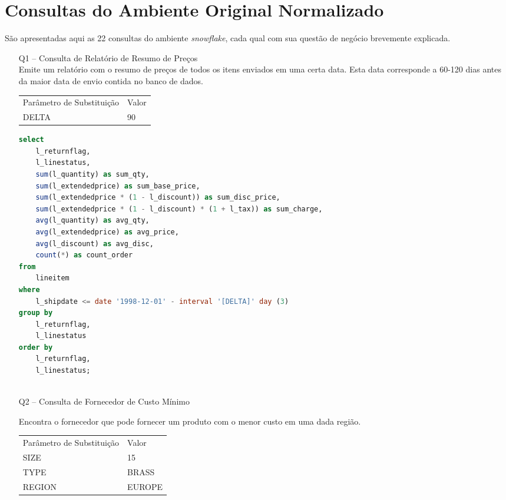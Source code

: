 
\chapter{Consultas do Ambiente Original Normalizado}
\label{queries_1}


São apresentadas aqui as 22 consultas do ambiente \textit{snowflake}, cada qual com sua questão de negócio brevemente explicada.

\begin{enumerate}

\item[Q1 --] Consulta de Relatório de Resumo de Preços \\
	Emite um relatório com o resumo de preços de todos os itens enviados em uma certa data. Esta data corresponde a 60-120 dias antes da maior data de envio contida no banco de dados. 
    
\begin{tabular}{ll}
	Parâmetro de Substituição & Valor\\
	DELTA & 90\\
\end{tabular}
    
	\begin{lstlisting}[language=SQL]
select
	l_returnflag,
	l_linestatus,
	sum(l_quantity) as sum_qty,
	sum(l_extendedprice) as sum_base_price,
	sum(l_extendedprice * (1 - l_discount)) as sum_disc_price,
	sum(l_extendedprice * (1 - l_discount) * (1 + l_tax)) as sum_charge,
	avg(l_quantity) as avg_qty,
	avg(l_extendedprice) as avg_price,
	avg(l_discount) as avg_disc,
	count(*) as count_order
from
	lineitem
where
	l_shipdate <= date '1998-12-01' - interval '[DELTA]' day (3)
group by
	l_returnflag,
	l_linestatus
order by
	l_returnflag,
	l_linestatus;
	
	\end{lstlisting}

\item[Q2 --] Consulta de Fornecedor de Custo Mínimo

Encontra o fornecedor que pode fornecer um produto com o menor custo em uma dada região.
	
\begin{tabular}{ll}
	Parâmetro de Substituição & Valor\\
	SIZE & 15\\
	TYPE & BRASS\\
	REGION & EUROPE\\
\end{tabular}


\end{enumerate}
